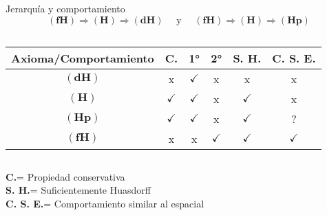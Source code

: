 \documentclass[compress,12pt]{beamer}
\begin{document}
\begin{frame}{Jerarquía y comportamiento}
    \[
    \mathbf{(fH)}\Rightarrow \mathbf{(H)}\Rightarrow \mathbf{(dH)} \quad\mbox{ y }  \quad
    \mathbf{(fH)}\Rightarrow \mathbf{(H)} \Rightarrow \mathbf{(Hp)}
    \]
\begin{tiny}
$$\mbox{ }$$
\end{tiny}

\begin{center}
\begin{tabular}{| c | c | c | c | c | c |}
\hline
 Axioma/Comportamiento & \textbf{C.} & 1° & 2° & \textbf{S. H.} & \textbf{C. S. E.}\\ \hline
$\mathbf{(dH)}$ & x & $\checkmark$ & x & x & x \\ \hline
$\mathbf{(H)}$ & $\checkmark$ & $\checkmark$ & x & $\checkmark$ & x \\ \hline
$\mathbf{(Hp)}$ & $\checkmark$ & $\checkmark$ & x & $\checkmark$ & ? \\ \hline
$\mathbf{(fH)}$ & x & x &  $\checkmark$ & $\checkmark$ & $\checkmark$ \\ \hline
\end{tabular}
\end{center}
\begin{tiny}
$$\mbox{ }$$
\end{tiny}

\textbf{C.}= Propiedad conservativa\\
\textbf{S. H.}= Suficientemente Huasdorff\\
\textbf{C. S. E.}= Comportamiento similar al espacial


    

    
\end{frame}
\end{document}
